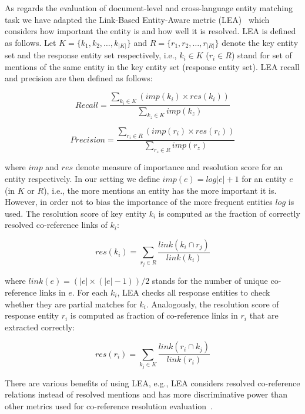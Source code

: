 \documentclass[11pt]{article}
\begin{document}
As regards the evaluation of document-level and cross-language entity matching task we have adapted the 
Link-Based Entity-Aware metric (LEA)~\cite{DBLP:conf-acl-Moosavi016} which considers how important the entity is and how well it is resolved. LEA is defined as follows. Let $K = \{k_1,k_2,\ldots,k_{|K|} \}$ and $R = \{r_1,r_2,\ldots,r_{|R|} \}$ denote the key entity set and the response entity set respectively, i.e., $k_i \in K$ ($r_i \in R$) stand for set of mentions
of the same entity in the key entity set (response entity set). LEA recall and precision are then defined as follows:

\begin{equation*}
Recall = \frac{\sum_{k_{i} \in K} (imp(k_i) \times res(k_{i}))}
              {\sum_{k_{z} \in K} imp(k_{z})}
\end{equation*}

\begin{equation*}
Precision = \frac{\sum_{r_{i} \in R} (imp(r_i) \times res(r_{i}))}
              {\sum_{r_{z} \in R} imp(r_{z})}
\end{equation*}

\noindent where $imp$ and $res$ denote measure of importance and resolution score for an entity respectively.
In our setting we define $imp(e) = log|e|+1$ for an entity $e$ (in $K$ or $R$), i.e., the more mentions 
an entity has the more important it is. However, in order not to bias the importance of the more frequent entities $log$ 
is used. The resolution score of key entity $k_i$ is computed as the fraction of correctly resolved co-reference 
links of $k_i$: 

\begin{equation*}
res(k_i) = \sum_{r_{j} \in R} \frac{link(k_{i} \cap r_{j})}{link(k_{i})}
\end{equation*}

\noindent where $link(e) = (|e| \times (|e|-1))/2$ stands for the number of unique 
co-reference links in $e$. For each $k_i$, LEA checks all response entities to check whether 
they are partial matches for $k_i$. Analogously, the resolution score of response entity $r_i$ is
computed as fraction of co-reference links in $r_i$ that are extracted correctly:

\begin{equation*}
res(r_i) = \sum_{k_{j} \in K} \frac{link(r_{i} \cap k_{j})}{link(r_{i})}
\end{equation*}

There are various benefits of using LEA, e.g., LEA considers resolved co-reference relations 
instead of resolved mentions and has more discriminative power than other metrics used
for co-reference resolution evaluation~\cite{DBLP:conf-acl-Moosavi016}.
\end{document}
